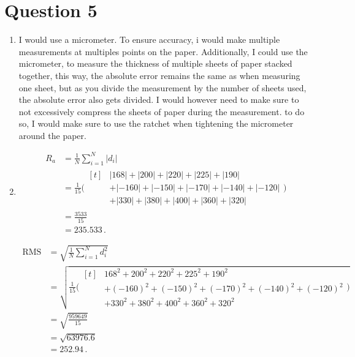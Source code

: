 \documentclass[11pt,letterpaper]{article}
\begin{document}
\clearpage

\section*{Question 5}

\begin{enumerate}[label=(\alph*), leftmargin=2.5em, itemsep=0.8em, topsep=0.5em]
\item I would use a micrometer. To ensure accuracy, i would make multiple measurements at multiples points on the paper. Additionally, I could use the micrometer, to measure the thickness of multiple sheets of paper stacked together, this way, the absolute error remains the same as when measuring one sheet, but as you divide the measurement by the number of sheets used, the absolute error also gets divided. I would however need to make sure to not excessively compress the sheets of paper during the measurement. to do so, I would make sure to use the ratchet when tightening the micrometer around the paper.
\item 
\begin{align*}
    R_a &= \frac{1}{N} \sum\limits_{i = 1}^{N} |d_i|\\
        &= \frac{1}{15}\Big(
            \begin{aligned}[t]
                &|168|+|200|+|220|+|225|+|190|\\
                &+|-160|+|-150|+|-170|+|-140|+|-120|\\
                &+|330|+|380|+|400|+|360|+|320|
            \end{aligned}
        \Big)\\
        &= \frac{3533}{15} \\
        &= 235.533\,.
\end{align*}

\begin{align*}
    \text{RMS} &= \sqrt{\frac{1}{N} \sum\limits_{i = 1}^{N} d_i^2}\\
               &= \sqrt{\frac{1}{15}\Big(
                    \begin{aligned}[t]
                        &168^2+200^2+220^2+225^2+190^2\\
                        &+(-160)^2+(-150)^2+(-170)^2+(-140)^2+(-120)^2\\
                        &+330^2+380^2+400^2+360^2+320^2
                    \end{aligned}
                \Big)}\\
               &= \sqrt{\frac{959649}{15}}\\
               &= \sqrt{63976.6}\\
               &= 252.94\,.
\end{align*}



\end{enumerate}
\end{document}
